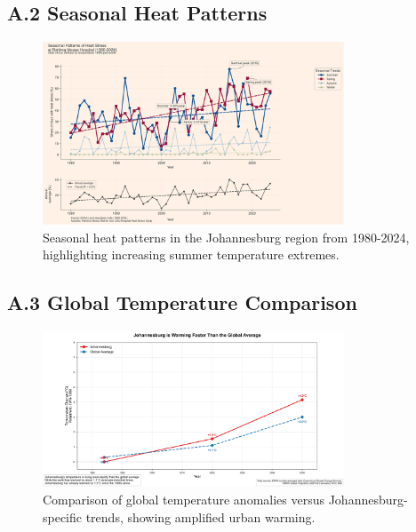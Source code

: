 \documentclass[12pt,a4paper,landscape]{article}
\begin{document}
\subsection*{A.2 Seasonal Heat Patterns}
\begin{figure}[H]
    \centering
    \includegraphics[width=0.8\textwidth]{images/seasonal_heat_Rahima_1980_2024.png}
    \caption{Seasonal heat patterns in the Johannesburg region from 1980-2024, highlighting increasing summer temperature extremes.}
    \label{fig:seasonal}
\end{figure}

\subsection*{A.3 Global Temperature Comparison}
\begin{figure}[H]
    \centering
    \includegraphics[width=0.8\textwidth]{images/global_temp_versus_Johannesburg.png}
    \caption{Comparison of global temperature anomalies versus Johannesburg-specific trends, showing amplified urban warming.}
    \label{fig:global_comparison}
\end{figure}
\end{document}
